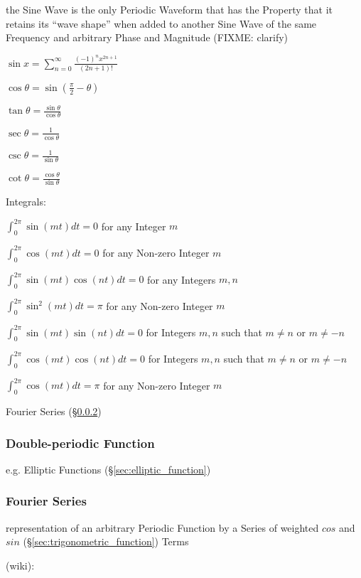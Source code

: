the Sine Wave is the only Periodic Waveform that has the Property that it
retains its ``wave shape'' when added to another Sine Wave of the same
Frequency and arbitrary Phase and Magnitude (FIXME: clarify)

$\sin x = \sum_{n=0}^\infty \frac{(-1)^n x^{2n+1}}{(2n + 1)!}$

$\cos\theta= \sin(\frac{\pi}{2} - \theta)$

$\tan\theta = \frac{\sin\theta}{\cos\theta}$

$\sec\theta = \frac{1}{\cos\theta}$

$\csc\theta = \frac{1}{\sin\theta}$

$\cot\theta = \frac{\cos\theta}{\sin\theta}$

Integrals:

$\int_0^{2\pi} \sin(mt)dt = 0$ for any Integer $m$

$\int_0^{2\pi} \cos(mt)dt = 0$ for any Non-zero Integer $m$

$\int_0^{2\pi} \sin(mt)\cos(nt)dt = 0$ for any Integers $m,n$

$\int_0^{2\pi} \sin^2(mt)dt = \pi$ for any Non-zero Integer $m$

$\int_0^{2\pi} \sin(mt)\sin(nt)dt = 0$ for Integers $m,n$ such that $m\neq{n}$
or $m\neq{-n}$

$\int_0^{2\pi} \cos(mt)\cos(nt)dt = 0$ for Integers $m,n$ such that $m\neq{n}$
or $m\neq{-n}$

$\int_0^{2\pi} \cos(mt)dt = \pi$ for any Non-zero Integer $m$

\fist Fourier Series (\S\ref{sec:fourier_series})



\subsubsection{Double-periodic Function}\label{sec:double_periodic}

e.g. Elliptic Functions (\S\ref{sec:elliptic_function})



\subsubsection{Fourier Series}\label{sec:fourier_series}

representation of an arbitrary Periodic Function by a Series of weighted $cos$
and $sin$ (\S\ref{sec:trigonometric_function}) Terms

(wiki):


